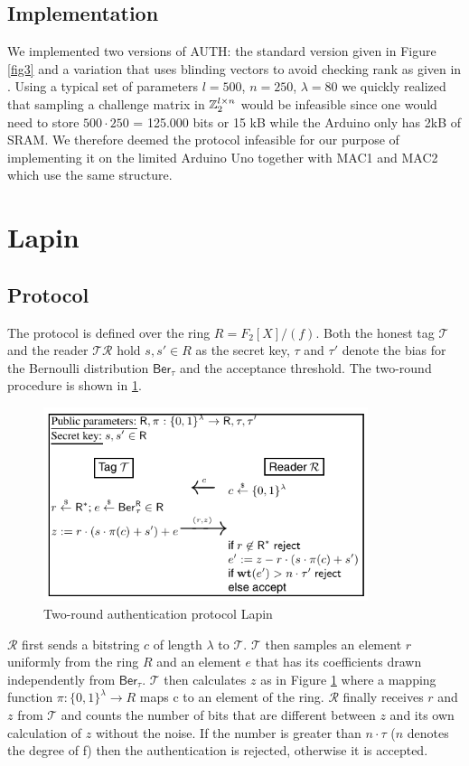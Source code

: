 \documentclass[11pt,a4paper]{article}
\begin{document}
\subsection{Implementation}

We implemented two versions of AUTH: the standard version given in Figure \ref{fig3} and a variation that uses blinding vectors to avoid checking rank as given in \cite{Kiltz2017}. 
Using a typical set of parameters $l=500$, $n=250$, $\lambda = 80$ we quickly realized that sampling a challenge matrix in $\mathbb{Z}_2^{l \times n}$ would be infeasible since one would need to store $500 \cdot 250$ = 125.000 bits or 15 kB while the Arduino only has 2kB of SRAM. We therefore deemed the protocol infeasible for our purpose of implementing it on the limited Arduino Uno together with MAC1 and MAC2 which use the same structure.


\section{Lapin}

\subsection{Protocol}

The protocol is defined over the ring $R = F_2[X] / (f)$. Both the honest tag $\mathcal{T}$ and the reader $\mathcal{TR}$ hold $s, s' \in R$ as the secret key, $\tau$ and $\tau'$ denote the bias for the Bernoulli distribution $\mathsf{Ber}_\tau$ and the acceptance threshold. The two-round procedure is shown in \ref{fig4}.

\begin{figure}[h]
	\includegraphics[width=9.5cm]{lapin}
	\centering
	\caption{Two-round authentication protocol Lapin}
	\label{fig4}
\end{figure}

$\mathcal{R}$ first sends a bitstring $c$ of length $\lambda$ to $\mathcal{T}$. $\mathcal{T}$ then samples an element $r$ uniformly from the ring $R$ and an element $e$ that has its coefficients drawn independently from $\mathsf{Ber}_\tau$. 
$\mathcal{T}$ then calculates $z$ as in Figure \ref{fig4} where a mapping function $\pi: \{0,1\}^\lambda \rightarrow R$ maps c to an element of the ring. 
$\mathcal{R}$ finally receives $r$ and $z$ from $\mathcal{T}$ and counts the number of bits that are different between $z$ and its own calculation of $z$ without the noise. 
If the number is greater than $n \cdot \tau$ ($n$ denotes the degree of f) then the authentication is rejected, otherwise it is accepted.
\end{document}
